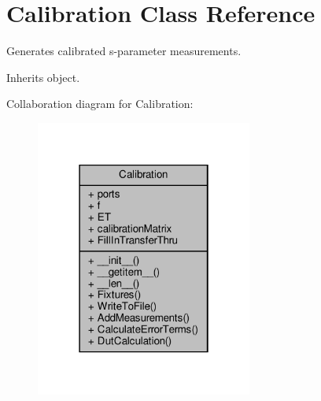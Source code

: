 \hypertarget{classSignalIntegrity_1_1Measurement_1_1Calibration_1_1Calibration_1_1Calibration}{}\section{Calibration Class Reference}
\label{classSignalIntegrity_1_1Measurement_1_1Calibration_1_1Calibration_1_1Calibration}


Generates calibrated s-\/parameter measurements.  




Inherits object.



Collaboration diagram for Calibration\+:\nopagebreak
\begin{figure}[H]
\begin{center}
\leavevmode
\includegraphics[width=202pt]{classSignalIntegrity_1_1Measurement_1_1Calibration_1_1Calibration_1_1Calibration__coll__graph}
\end{center}
\end{figure}
